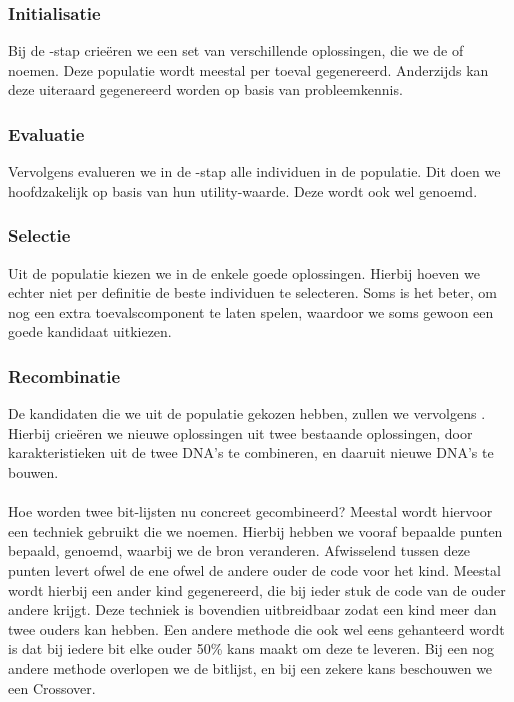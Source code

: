 \subsubsection{Initialisatie} Bij de -stap crie\"eren we een set van verschillende oplossingen, die we de  of  noemen. Deze populatie wordt meestal per toeval gegenereerd. Anderzijds kan deze uiteraard gegenereerd worden op basis van probleemkennis.
\subsubsection{Evaluatie}Vervolgens evalueren we in de -stap alle individuen in de populatie. Dit doen we hoofdzakelijk op basis van hun utility-waarde. Deze wordt ook wel  genoemd.
\subsubsection{Selectie}Uit de populatie kiezen we in de  enkele goede oplossingen. Hierbij hoeven we echter niet per definitie de beste individuen te selecteren. Soms is het beter, om nog een extra toevalscomponent te laten spelen, waardoor we soms gewoon een goede kandidaat uitkiezen.
\subsubsection{Recombinatie}De kandidaten die we uit de populatie gekozen hebben, zullen we vervolgens . Hierbij crie\"eren we nieuwe oplossingen uit twee bestaande oplossingen, door karakteristieken uit de twee DNA's te combineren, en daaruit nieuwe DNA's te bouwen.
\paragraph{}
Hoe worden twee bit-lijsten nu concreet gecombineerd? Meestal wordt hiervoor een techniek gebruikt die we  noemen. Hierbij hebben we vooraf bepaalde punten bepaald,  genoemd, waarbij we de bron veranderen. Afwisselend tussen deze punten levert ofwel de ene ofwel de andere ouder de code voor het kind. Meestal wordt hierbij een ander kind gegenereerd, die bij ieder stuk de code van de ouder andere krijgt. Deze techniek is bovendien uitbreidbaar zodat een kind meer dan twee ouders kan hebben. Een andere methode die ook wel eens gehanteerd wordt is dat bij iedere bit elke ouder 50\% kans maakt om deze te leveren. Bij een nog andere methode overlopen we de bitlijst, en bij een zekere kans beschouwen we een Crossover.
